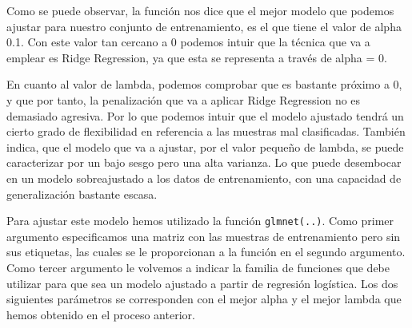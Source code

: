 \documentclass[spanish,]{article}
\begin{document}
Como se puede observar, la función nos dice que el mejor modelo que
podemos ajustar para nuestro conjunto de entrenamiento, es el que tiene
el valor de alpha 0.1. Con este valor tan cercano a 0 podemos intuir que
la técnica que va a emplear es Ridge Regression, ya que esta se
representa a través de alpha = 0.

En cuanto al valor de lambda, podemos comprobar que es bastante próximo
a 0, y que por tanto, la penalización que va a aplicar Ridge Regression
no es demasiado agresiva. Por lo que podemos intuir que el modelo
ajustado tendrá un cierto grado de flexibilidad en referencia a las
muestras mal clasificadas. También indica, que el modelo que va a
ajustar, por el valor pequeño de lambda, se puede caracterizar por un
bajo sesgo pero una alta varianza. Lo que puede desembocar en un modelo
sobreajustado a los datos de entrenamiento, con una capacidad de
generalización bastante escasa.

Para ajustar este modelo hemos utilizado la función \texttt{glmnet(..)}.
Como primer argumento especificamos una matriz con las muestras de
entrenamiento pero sin sus etiquetas, las cuales se le proporcionan a la
función en el segundo argumento. Como tercer argumento le volvemos a
indicar la familia de funciones que debe utilizar para que sea un modelo
ajustado a partir de regresión logística. Los dos siguientes parámetros
se corresponden con el mejor alpha y el mejor lambda que hemos obtenido
en el proceso anterior.
\end{document}
